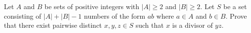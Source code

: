 Let $A$ and $B$ be sets of positive integers with $|A|\ge 2$ and $|B|\ge 2$. Let $S$ be a set consisting of $|A|+|B|-1$ numbers of the form $ab$ where $a\in A$ and $b\in B$. Prove that there exist pairwise distinct $x,y,z\in S$ such that $x$ is a divisor of $yz$.